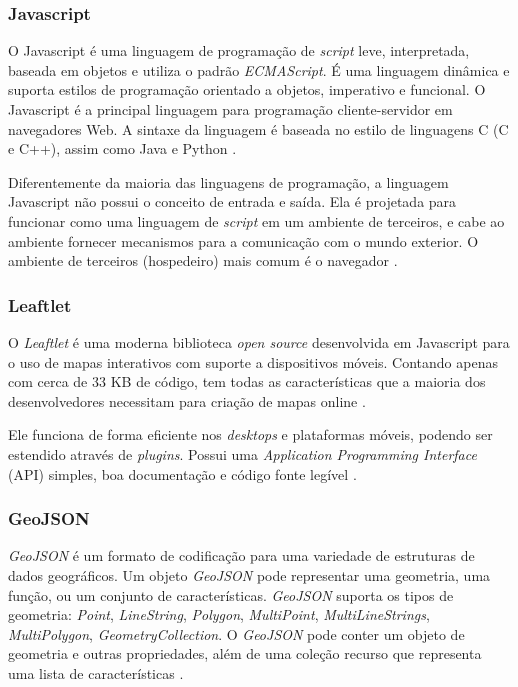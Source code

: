 \subsubsection{Javascript}

O Javascript é uma linguagem de programação de \textit{script} leve, interpretada, baseada em objetos e utiliza o padrão \textit{ECMAScript}. É uma linguagem dinâmica e suporta estilos de programação orientado a objetos, imperativo e funcional. O Javascript é a principal linguagem para programação cliente-servidor em navegadores Web. A sintaxe da linguagem é baseada no estilo de linguagens C (C e C++), assim como Java e Python \cite{javascript}.

Diferentemente da maioria das linguagens de programação, a linguagem Javascript não possui o conceito de entrada e saída. Ela é projetada para funcionar como uma linguagem de \textit{script} em um ambiente de terceiros, e cabe ao ambiente fornecer mecanismos para a comunicação com o mundo exterior. O ambiente de terceiros (hospedeiro) mais comum é o navegador \cite{introjavascript}.

\subsubsection{Leaftlet}

O \textit{Leaftlet} é uma moderna biblioteca \textit{open source} desenvolvida em Javascript para o uso de mapas interativos com suporte a dispositivos móveis. Contando apenas com cerca de 33 KB de código, tem todas as características que a maioria dos desenvolvedores necessitam para criação de mapas online \cite{leaflet}.

Ele funciona de forma eficiente nos \textit{desktops} e plataformas móveis, podendo ser estendido através de \textit{plugins}. Possui uma \textit{Application Programming Interface} (API) simples, boa documentação e código fonte legível \cite{leaflet}.

\subsubsection{GeoJSON}

\textit{GeoJSON} é um formato de codificação para uma variedade de estruturas de dados geográficos. Um objeto \textit{GeoJSON} pode representar uma geometria, uma função, ou um conjunto de características. \textit{GeoJSON} suporta os tipos de geometria: \textit{Point}, \textit{LineString}, \textit{Polygon}, \textit{MultiPoint}, \textit{MultiLineStrings}, \textit{MultiPolygon}, \textit{GeometryCollection}. O \textit{GeoJSON} pode conter um objeto de geometria e outras propriedades, além de uma coleção recurso que representa uma lista de características \cite{geojson}.

